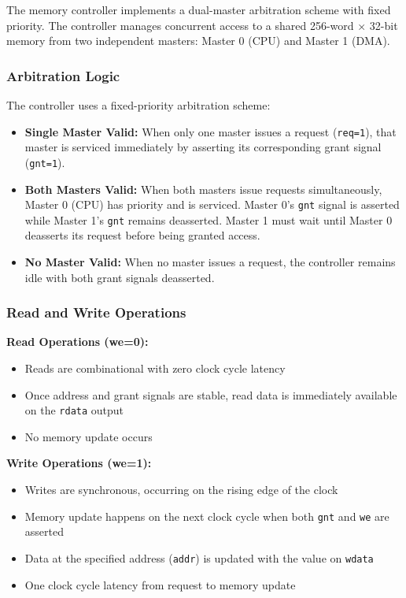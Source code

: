 \documentclass{article}
\begin{document}
The memory controller implements a dual-master arbitration scheme with fixed priority. The controller manages concurrent access to a shared 256-word × 32-bit memory from two independent masters: Master 0 (CPU) and Master 1 (DMA).

\subsubsection{Arbitration Logic}

The controller uses a fixed-priority arbitration scheme:

\begin{itemize}
    \item \textbf{Single Master Valid:} When only one master issues a request (\texttt{req=1}), that master is serviced immediately by asserting its corresponding grant signal (\texttt{gnt=1}).
    
    \item \textbf{Both Masters Valid:} When both masters issue requests simultaneously, Master 0 (CPU) has priority and is serviced. Master 0's \texttt{gnt} signal is asserted while Master 1's \texttt{gnt} remains deasserted. Master 1 must wait until Master 0 deasserts its request before being granted access.
    
    \item \textbf{No Master Valid:} When no master issues a request, the controller remains idle with both grant signals deasserted.
\end{itemize}

\subsubsection{Read and Write Operations}

\textbf{Read Operations (we=0):}
\begin{itemize}
    \item Reads are combinational with zero clock cycle latency
    \item Once address and grant signals are stable, read data is immediately available on the \texttt{rdata} output
    \item No memory update occurs
\end{itemize}

\textbf{Write Operations (we=1):}
\begin{itemize}
    \item Writes are synchronous, occurring on the rising edge of the clock
    \item Memory update happens on the next clock cycle when both \texttt{gnt} and \texttt{we} are asserted
    \item Data at the specified address (\texttt{addr}) is updated with the value on \texttt{wdata}
    \item One clock cycle latency from request to memory update
\end{itemize}
\end{document}
